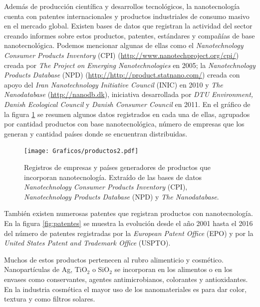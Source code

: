 	 Además de producción científica y desarrollos tecnológicos, la nanotecnología cuenta con patentes internacionales y productos industriales de consumo masivo en el mercado global. Existen bases de datos que registran la actividad del sector creando informes sobre estos productos, patentes, estándares y compañías de base nanotecnológica. Podemos mencionar algunas de ellas como el \textit{Nanotechnology Consumer Products Inventory} (CPI) (\url{http://www.nanotechproject.org/cpi/}) creada por \textit{The Project on Emerging Nanotechnologies} en 2005\cite{Vance2015}; la \textit{Nanotechnology Products Database} (NPD) (\url{http://http://product.statnano.com/}) creada con apoyo del \textit{Iran Nanotechnology Initiative Council} (INIC) en 2010 y \textit{The Nanodatabase} (\url{http://nanodb.dk}), iniciativa desarrollada por \textit{DTU Environment, Danish Ecological Council} y \textit{Danish Consumer Council} en 2011. En el gráfico de la figura \ref{fig:productos} se resumen algunos datos registrados en cada una de ellas, agrupados por cantidad productos con base nanotecnológica, número de empresas que los generan y cantidad países donde se encuentran distribuidas.

		\begin{figure}[ht!]
 			\begin{center}
 			\texttt{[image: Graficos/productos2.pdf]}
 			\caption[Cantidad de productos, compañías y origen con base nanotecnologica]{Registros de empresas y países generadores de productos que incorporan nanotecnología. Extraído de las bases de datos \textit{Nanotechnology Consumer Products Inventory} (CPI), \textit{Nanotechnology Products Database} (NPD) y \textit{The Nanodatabase}.}
 			\label{fig:productos}
 		    \end{center}
 		    \end{figure}

 	 También existen numerosas patentes que registran productos con nanotecnología. En la figura \ref{fig:patentes} se muestra la evolución desde el año 2001 hasta el 2016 del número de patentes registradas por la \textit{European Patent Office} (EPO) y por la \textit{United States Patent and Trademark Office} (USPTO).

     Muchos de estos productos pertenecen al rubro alimenticio y cosmético. Nanopartículas de Ag, TiO$_2$ o SiO$_2$ se incorporan en los alimentos o en los envases como conservantes, agentes antimicrobianos, colorantes y antioxidantes. En la industria cosmética el mayor uso de los nanomateriales es para dar color, textura y como filtros solares.
 	
